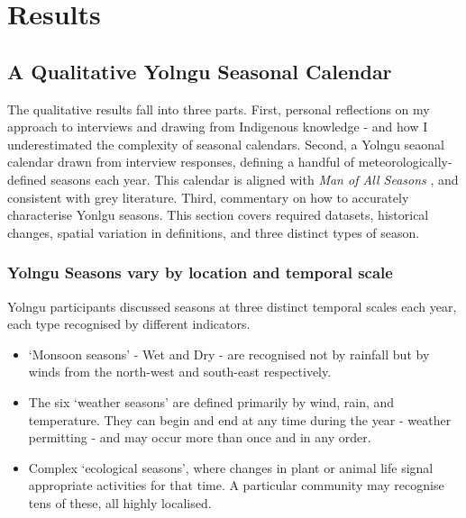 \chapter{Results}
\label{ch:results}




\section{A Qualitative Yolngu Seasonal Calendar}

The qualitative results fall into three parts.
%
First, personal reflections on my approach to interviews and drawing
from Indigenous knowledge - and how I underestimated the complexity
of seasonal calendars.
%
Second, a Yolngu seaonal calendar drawn from interview responses,
defining a handful of meteorologically-defined seasons each year.
This calendar is aligned with \textit{Man of All Seasons} \citep{davis1989},
and consistent with grey literature.
%
Third, commentary on how to accurately characterise Yonlgu seasons.
This section covers required datasets, historical changes, spatial
variation in definitions, and three distinct types of season.





\subsection{Yolngu Seasons vary by location and temporal scale}
\label{subsec:three-seasons-scales}

Yolngu participants discussed seasons at three distinct temporal scales
each year, each type recognised by different indicators.
\begin{itemize}
\item `Monsoon seasons' - Wet and Dry - are recognised not by rainfall but
        by winds from the north-west and south-east respectively.
\item The six `weather seasons' are defined primarily by wind, rain, and temperature.
        They can begin and end at any time during the year - weather permitting -
        and may occur more than once and in any order.
\item Complex `ecological seasons', where changes in plant or animal life
        signal appropriate activities for that time.  A particular community
        may recognise tens of these, all highly localised.
\end{itemize}

